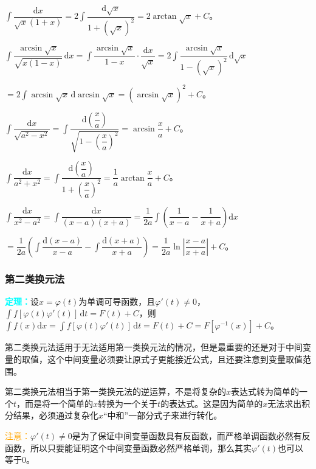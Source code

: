 \documentclass[UTF8, 12pt]{ctexart}
\begin{document}
$\displaystyle{\int\dfrac{\textrm{d}x}{\sqrt{x}(1+x)}=2\int\dfrac{\textrm{d}\sqrt{x}}{1+(\sqrt{x})^2}}=2\arctan\sqrt{x}+C$。\medskip

$\displaystyle{\int\dfrac{\arcsin\sqrt{x}}{\sqrt{x(1-x)}}\,\textrm{d}x=\int\dfrac{\arcsin\sqrt{x}}{1-x}\cdot\dfrac{\textrm{d}x}{\sqrt{x}}=2\int\dfrac{\arcsin\sqrt{x}}{1-(\sqrt{x})^2}\,\textrm{d}\sqrt{x}}$ \medskip

$=2\int\arcsin\sqrt{x}\,\textrm{d}\arcsin\sqrt{x}=(\arcsin\sqrt{x})^2+C$。\medskip

$\displaystyle{\int\dfrac{\textrm{d}x}{\sqrt{a^2-x^2}}}=\displaystyle{\int\dfrac{\textrm{d}\left(\dfrac{x}{a}\right)}{\sqrt{1-\left(\dfrac{x}{a}\right)^2}}}=\arcsin\dfrac{x}{a}+C$。

$\displaystyle{\int\dfrac{\textrm{d}x}{a^2+x^2}}=\displaystyle{\int\dfrac{\textrm{d}\left(\dfrac{x}{a}\right)}{1+\left(\dfrac{x}{a}\right)^2}}=\dfrac{1}{a}\arctan\dfrac{x}{a}+C$。\medskip

$\displaystyle{\int\dfrac{\textrm{d}x}{x^2-a^2}}=\displaystyle{\int\dfrac{\textrm{d}x}{(x-a)(x+a)}}=\dfrac{1}{2a}\displaystyle{\int\left(\dfrac{1}{x-a}-\dfrac{1}{x+a}\right)\textrm{d}x}$ \medskip

$=\dfrac{1}{2a}\left(\displaystyle{\int\dfrac{\textrm{d}(x-a)}{x-a}-\int\dfrac{\textrm{d}(x+a)}{x+a}}\right)=\dfrac{1}{2a}\ln\left\vert\dfrac{x-a}{x+a}\right\vert+C$。

\subsubsection{第二类换元法}

\textcolor{aqua}{\textbf{定理：}}设$x=\varphi(t)$为单调可导函数，且$\varphi'(t)\neq 0$，$\int f[\varphi(t)\varphi'(t)]\,\textrm{d}t=F(t)+C$，则$\int f(x)\textrm{d}x=\int f[\varphi(t)\varphi'(t)]\,\textrm{d}t=F(t)+C=F[\varphi^{-1}(x)]+C$。

第二类换元法适用于无法适用第一类换元法的情况，但是最重要的还是对于中间变量的取值，这个中间变量必须要让原式子更能接近公式，且还要注意到变量取值范围。

第二类换元法相当于第一类换元法的逆运算，不是将复杂的$x$表达式转为简单的一个$t$，而是将一个简单的$x$转换为一个关于$t$的表达式。这是因为简单的$x$无法求出积分结果，必须通过复杂化$x$“中和”一部分式子来进行转化。

\textcolor{orange}{注意：}$\varphi'(t)\neq 0$是为了保证中间变量函数具有反函数，而严格单调函数必然有反函数，所以只要能证明这个中间变量函数必然严格单调，那么其实$\varphi'(t)$也可以等于0。
\end{document}

